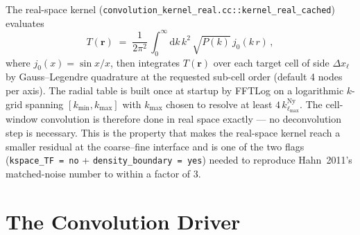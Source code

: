 \documentclass[12pt]{article}
\newcommand{\br}{\mathbf{r}}
\newcommand{\code}[1]{\texttt{#1}}
\begin{document}
The real-space kernel
(\code{convolution\_kernel\_real.cc::kernel\_real\_cached}) evaluates
\begin{equation}
  T(\br) \;=\; \frac{1}{2\pi^2}\,\int_0^\infty\!\mathrm{d}k\,k^2\,
              \sqrt{P(k)}\,j_0(k\,r)\,,
  \label{eq:tf-real}
\end{equation}
where $j_0(x) = \sin x / x$, then integrates $T(\br)$ over each
target cell of side $\Delta x_\ell$ by Gauss--Legendre quadrature at
the requested sub-cell order (default 4 nodes per axis).  The radial
table is built once at startup by FFTLog
\citep{Talman1978, Hamilton2000} on a logarithmic $k$-grid spanning
$[k_\mathrm{min}, k_\mathrm{max}]$ with $k_\mathrm{max}$ chosen to
resolve at least $4\,k^\mathrm{Ny}_{\ell_\mathrm{max}}$.  The
cell-window convolution is therefore done in real space exactly --- no
deconvolution step is necessary.  This is the property that makes
the real-space kernel reach a smaller residual at the coarse--fine
interface and is one of the two flags
(\code{kspace\_TF = no} + \code{density\_boundary = yes}) needed to
reproduce Hahn~2011's matched-noise number to within a factor of 3.

\section{The Convolution Driver}
\label{sec:delta-driver}
\end{document}
